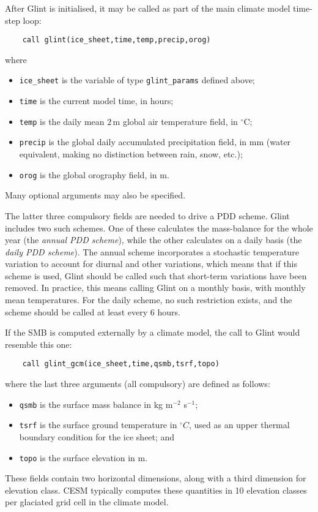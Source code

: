 After Glint is initialised, it may be called as part of the main climate
model time-step loop:
%
\begin{verbatim}
    call glint(ice_sheet,time,temp,precip,orog)
\end{verbatim} 
%
where
%
\begin{itemize}
\item \texttt{ice\_sheet} is the variable of type \texttt{glint\_params} defined above;
\item \texttt{time} is the current model time, in hours;
\item \texttt{temp} is the daily mean $2\,\mathrm{m}$ global air temperature field, in
  $^{\circ}\mathrm{C}$;
\item \texttt{precip} is the global daily accumulated precipitation field,
  in $\mathrm{mm}$ (water equivalent, making no distinction
  between rain, snow, etc.);
\item \texttt{orog} is the global orography field, in $\mathrm{m}$.
\end{itemize}
Many optional arguments may also be specified.

The latter three compulsory fields are needed to drive a PDD scheme.
Glint includes two such schemes.  One of these calculates the mass-balance for the
whole year (the \emph{annual PDD scheme}), while the other calculates on a
daily basis (the \emph{daily PDD scheme}). The annual scheme incorporates a
stochastic temperature variation to account for diurnal and other variations,
which means that if this scheme is used, Glint should be called such
that short-term variations have been removed.  In practice, this means calling 
Glint on a monthly basis, with monthly mean temperatures. 
For the daily scheme, no such restriction exists,
and the scheme should be called at least every 6 hours.

If the SMB is computed externally by a climate model, the call to Glint would resemble this one:
\begin{verbatim}
    call glint_gcm(ice_sheet,time,qsmb,tsrf,topo)
\end{verbatim} 
%
where the last three arguments (all compulsory) are defined as follows:
%
\begin{itemize}
\item \texttt{qsmb} is the surface mass balance in kg m$^{-2}$ s$^{-1}$;
\item \texttt{tsrf} is the surface ground temperature in $^{\circ} C$, used as an upper 
thermal boundary condition for the ice sheet; and
\item \texttt{topo} is the surface elevation in m.
\end{itemize}
These fields contain two horizontal dimensions, along with a third dimension
for elevation class.  CESM typically computes these quantities in 10 elevation classes
per glaciated grid cell in the climate model.

